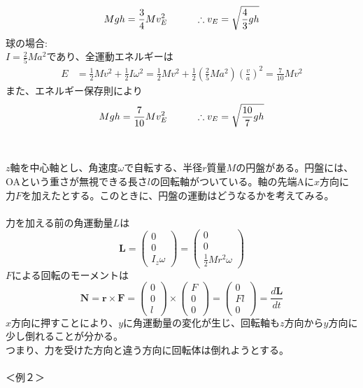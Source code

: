 \documentclass{jsarticle}
\begin{document}
\[Mgh=\frac{3}{4}Mv_{E}^{2}\hspace{10mm}\therefore v_{E}=\sqrt{\frac{4}{3}gh}\]
球の場合:\\
\(\displaystyle I=\frac{2}{5}Ma^{2}\)であり、全運動エネルギーは
\begin{align*}
E&=\frac{1}{2}Mv^{2}+\frac{1}{2}I\omega^{2}=\frac{1}{2}Mv^{2}+\frac{1}{2}\left(\frac{2}{5}Ma^{2}\right)\left(\frac{v}{a}\right)^{2}=\frac{7}{10}Mv^{2}
\end{align*}
また、エネルギー保存則により
\[Mgh=\frac{7}{10}Mv_{E}^{2}\hspace{10mm}\therefore v_{E}=\sqrt{\frac{10}{7}gh}\]
\\
\\
\(z\)軸を中心軸とし、角速度\(\omega\)で自転する、半径\(r\)質量\(M\)の円盤がある。円盤には、OAという重さが無視できる長さ\(l\)の回転軸がついている。軸の先端Aに\(x\)方向に力\(F\)を加えたとする。このときに、円盤の運動はどうなるかを考えてみる。\\
\\
力を加える前の角運動量\(L\)は
\[
\bm{L}=\left(\begin{array}{c}
0\\
0\\
I_{z}\omega\end{array}\right)=\left(\begin{array}{c}
0\\
0\\
\frac{1}{2}Mr^{2}\omega\end{array}\right)\]
\(F\)による回転のモーメントは
\[
\bm{N}=\bm{r}\times\bm{F}=\left(\begin{array}{c}
0\\
0\\
l\end{array}\right)\times\left(\begin{array}{c}
F\\
0\\
0\end{array}\right)=\left(\begin{array}{c}
0\\
Fl\\
0\end{array}\right)=\frac{d\bm{L}}{dt}
\]
\(x\)方向に押すことにより、\(y\)に角運動量の変化が生じ、回転軸も\(z\)方向から\(y\)方向に少し倒れることが分かる。\\
つまり、力を受けた方向と違う方向に回転体は倒れようとする。
\\
\\
＜例２＞\\
\end{document}
